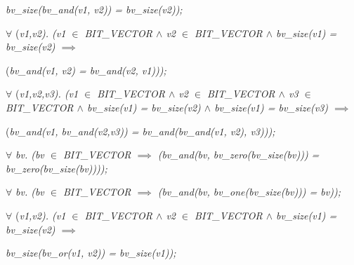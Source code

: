 \begin{sloppypar}
\hspace*{0.60in}\it bv\_size\rm (\it bv\_and\rm (\it v1\rm , \it v2\rm )\rm ) \rm = \it bv\_size\rm (\it v2\rm )\rm )\rm ;

\hspace*{0.20in} $\forall$  \rm (\it v1\rm ,\it v2\rm )\rm . \rm (\it v1  $\in$  \it BIT\_VECTOR  $\land$  \it v2  $\in$  \it BIT\_VECTOR\hspace*{0.10in} $\land$  \it bv\_size\rm (\it v1\rm ) \rm = \it bv\_size\rm (\it v2\rm )  $\implies$  

\hspace*{0.60in}\rm (\it bv\_and\rm (\it v1\rm , \it v2\rm ) \rm = \it bv\_and\rm (\it v2\rm , \it v1\rm )\rm )\rm )\rm ;

\hspace*{0.20in} $\forall$  \rm (\it v1\rm ,\it v2\rm ,\it v3\rm )\rm . \rm (\it v1  $\in$  \it BIT\_VECTOR  $\land$  \it v2  $\in$  \it BIT\_VECTOR $\land$  \it v3  $\in$  \it BIT\_VECTOR\hspace*{0.10in} $\land$  \it bv\_size\rm (\it v1\rm ) \rm = \it bv\_size\rm (\it v2\rm )  $\land$  \it bv\_size\rm (\it v1\rm ) \rm = \it bv\_size\rm (\it v3\rm )  $\implies$  

\hspace*{0.60in}\rm (\it bv\_and\rm (\it v1\rm , \it bv\_and\rm (\it v2\rm ,\it v3\rm )\rm ) \rm = \it bv\_and\rm (\it bv\_and\rm (\it v1\rm , \it v2\rm )\rm , \it v3\rm )\rm )\rm )\rm ;

\hspace*{0.20in} $\forall$  \it bv\rm . \rm (\it bv  $\in$  \it BIT\_VECTOR  $\implies$  \rm (\it bv\_and\rm (\it bv\rm , \it bv\_zero\rm (\it bv\_size\rm (\it bv\rm )\rm )\rm ) \rm = \it bv\_zero\rm (\it bv\_size\rm (\it bv\rm )\rm )\rm )\rm )\rm ;

\hspace*{0.20in} $\forall$  \it bv\rm . \rm (\it bv  $\in$  \it BIT\_VECTOR  $\implies$  \rm (\it bv\_and\rm (\it bv\rm , \it bv\_one\rm (\it bv\_size\rm (\it bv\rm )\rm )\rm ) \rm = \it bv\rm )\rm )\rm ;

\vspace*{4mm}
\hspace*{0.20in} $\forall$  \rm (\it v1\rm ,\it v2\rm )\rm . \rm (\it v1  $\in$  \it BIT\_VECTOR  $\land$  \it v2  $\in$  \it BIT\_VECTOR  $\land$  \it bv\_size\rm (\it v1\rm ) \rm = \it bv\_size\rm (\it v2\rm )  $\implies$  

\hspace*{0.60in}\it bv\_size\rm (\it bv\_or\rm (\it v1\rm , \it v2\rm )\rm ) \rm = \it bv\_size\rm (\it v1\rm )\rm )\rm ;


\end{sloppypar}
